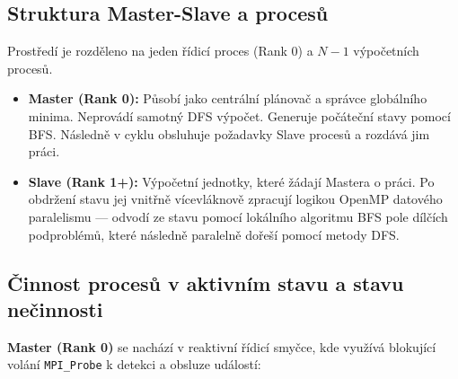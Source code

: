 \documentclass[11pt,a4paper]{article}
\begin{document}
\subsection{Struktura Master-Slave a procesů}
Prostředí je rozděleno na jeden řídicí proces (Rank 0) a $N-1$ výpočetních procesů.
\begin{itemize}
    \item \textbf{Master (Rank 0):} Působí jako centrální plánovač a správce globálního minima. Neprovádí samotný DFS výpočet. Generuje počáteční stavy pomocí BFS. Následně v cyklu obsluhuje požadavky Slave procesů a rozdává jim práci.
    \item \textbf{Slave (Rank 1+):} Výpočetní jednotky, které žádají Mastera o práci. Po obdržení stavu jej vnitřně vícevláknově zpracují logikou OpenMP datového paralelismu --- odvodí ze stavu pomocí lokálního algoritmu BFS pole dílčích podproblémů, které následně paralelně dořeší pomocí metody DFS.
\end{itemize}

\subsection{Činnost procesů v aktivním stavu a stavu nečinnosti}

\textbf{Master (Rank 0)} se nachází v reaktivní řídicí smyčce, kde využívá blokující volání \texttt{MPI\_Probe} k detekci a obsluze událostí:
\end{document}

